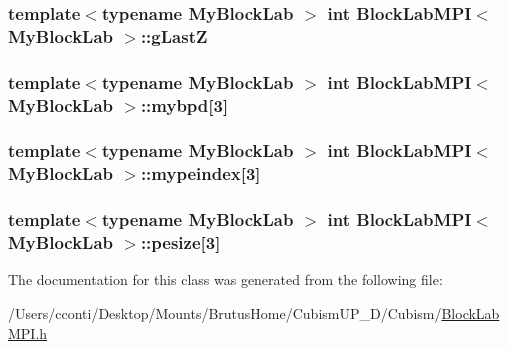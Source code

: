 \subsubsection[{g\+Last\+Z}]{\setlength{\rightskip}{0pt plus 5cm}template$<$typename My\+Block\+Lab $>$ int {\bf Block\+Lab\+M\+P\+I}$<$ My\+Block\+Lab $>$\+::g\+Last\+Z\hspace{0.3cm}{\ttfamily [protected]}}\label{class_block_lab_m_p_i_a8b9247a3ec2caad18896f597b98b7103}
\hypertarget{class_block_lab_m_p_i_a11a592341f9c28f07809f0d950512fe5}{}
\subsubsection[{mybpd}]{\setlength{\rightskip}{0pt plus 5cm}template$<$typename My\+Block\+Lab $>$ int {\bf Block\+Lab\+M\+P\+I}$<$ My\+Block\+Lab $>$\+::mybpd\mbox{[}3\mbox{]}\hspace{0.3cm}{\ttfamily [protected]}}\label{class_block_lab_m_p_i_a11a592341f9c28f07809f0d950512fe5}
\hypertarget{class_block_lab_m_p_i_a346371e08c48393a09a60188aa210828}{}
\subsubsection[{mypeindex}]{\setlength{\rightskip}{0pt plus 5cm}template$<$typename My\+Block\+Lab $>$ int {\bf Block\+Lab\+M\+P\+I}$<$ My\+Block\+Lab $>$\+::mypeindex\mbox{[}3\mbox{]}\hspace{0.3cm}{\ttfamily [protected]}}\label{class_block_lab_m_p_i_a346371e08c48393a09a60188aa210828}
\hypertarget{class_block_lab_m_p_i_a3c58102452df2ae20110af79d504693e}{}
\subsubsection[{pesize}]{\setlength{\rightskip}{0pt plus 5cm}template$<$typename My\+Block\+Lab $>$ int {\bf Block\+Lab\+M\+P\+I}$<$ My\+Block\+Lab $>$\+::pesize\mbox{[}3\mbox{]}\hspace{0.3cm}{\ttfamily [protected]}}\label{class_block_lab_m_p_i_a3c58102452df2ae20110af79d504693e}


The documentation for this class was generated from the following file\+:\begin{DoxyCompactItemize}
\item 
/\+Users/cconti/\+Desktop/\+Mounts/\+Brutus\+Home/\+Cubism\+U\+P\+\_\+D/\+Cubism/\hyperlink{_block_lab_m_p_i_8h}{Block\+Lab\+M\+P\+I.\+h}\end{DoxyCompactItemize}
